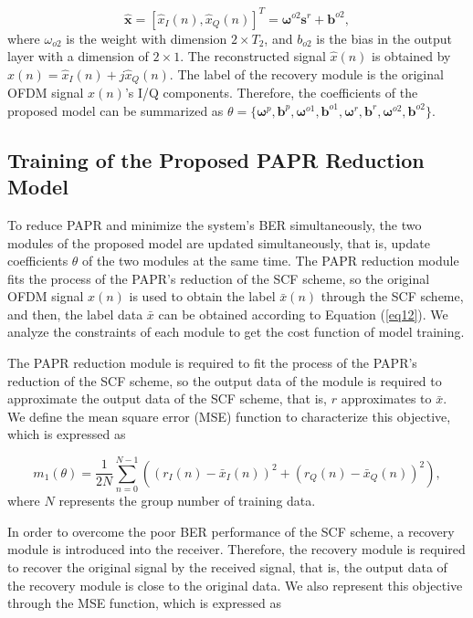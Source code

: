 \documentclass[journal]{IEEEtran}
\begin{document}
\begin{equation}
\mathbf{\hat{x}} = [\hat{x}_I(n), \hat{x}_Q(n)]^T = \boldsymbol{\omega}^{o2} \mathbf{s}^r + \mathbf{b}^{o2},
\label{eq15}
\end{equation}
where $\omega_{o2}$ is the weight with dimension $2 \times T_2$, and $b_{o2}$ is the bias in the output layer with a dimension of $2 \times 1$. The reconstructed signal $\hat{x}(n)$ is obtained by $\hat{x}(n) = \hat{x}_I(n) + j\hat{x}_Q(n)$. The label of the recovery module is the original OFDM signal $x(n)$'s I/Q components. Therefore, the coefficients of the proposed model can be summarized as $\theta = \{\boldsymbol{\omega}^p, \mathbf{b}^p, \boldsymbol{\omega}^{o1}, \mathbf{b}^{o1}, \boldsymbol{\omega}^r, \mathbf{b}^r, \boldsymbol{\omega}^{o2}, \mathbf{b}^{o2}\}$.

\subsection{Training of the Proposed PAPR Reduction Model}
To reduce PAPR and minimize the system's BER simultaneously, the two modules of the proposed model are updated simultaneously, that is, update coefficients $\theta$ of the two modules at the same time. The PAPR reduction module fits the process of the PAPR's reduction of the SCF scheme, so the original OFDM signal $x(n)$ is used to obtain the label $\bar{x}(n)$ through the SCF scheme, and then, the label data $\bar{x}$ can be obtained according to Equation (\ref{eq12}). We analyze the constraints of each module to get the cost function of model training.

The PAPR reduction module is required to fit the process of the PAPR's reduction of the SCF scheme, so the output data of the module is required to approximate the output data of the SCF scheme, that is, $r$ approximates to $\bar{x}$. We define the mean square error (MSE) function to characterize this objective, which is expressed as

\begin{equation}
m_1(\theta) = \frac{1}{2N} \sum_{n=0}^{N-1} ( (r_I(n) - \bar{x}_I(n))^2 + (r_Q(n) - \bar{x}_Q(n))^2 ),
\label{eq16}
\end{equation}
where $N$ represents the group number of training data.

In order to overcome the poor BER performance of the SCF scheme, a recovery module is introduced into the receiver. Therefore, the recovery module is required to recover the original signal by the received signal, that is, the output data of the recovery module is close to the original data. We also represent this objective through the MSE function, which is expressed as
\end{document}
